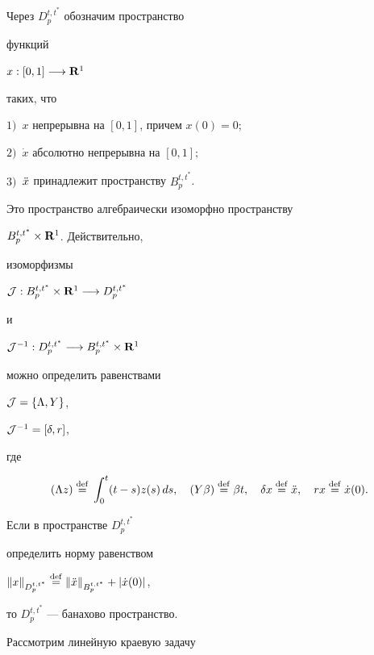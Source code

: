 Через ${ D}^{t,t^*}_p$ обозначим пространство


функций


$x:[0,1]\longrightarrow {\bold R}^1$


таких, что


{\it


$1)$~$x$ непрерывна на $[0,1]$, причем $x(0) = 0;$


$2)$~$\Dot x$ абсолютно непрерывна на $[0,1];$


$3)$~$\Ddot x$ принадлежит пространству $B^{t,t^*}_p$.


}





Это пространство алгебраически изоморфно пространству


${B}_p^{t,t^*}\times {\bold R}^1$. Действительно,


изоморфизмы


${\cal J}:{ B}^{t,t^*}_p\times{\bold R}^1 \seta


{ D}^{t,t^*}_p$


и


${\cal J}^{-1}: { D}^{t,t^*}_p


\seta { B}^{t,t^*}_p\times{\bold R}^1$


можно определить равенствами


${\cal J}=\{\Lambda, Y\}$,


${\cal J}^{-1}=[\delta, r]$,


где


$$


(\Lambda z)\eqdef\int_0^t (t-s)z(s)\,ds,\quad


(Y\beta)\eqdef\beta t,\quad


\delta x \eqdef\Ddot x,\quad


r x\eqdef \Dot x(0).


$$





Если в пространстве ${ D}^{t,t^*}_p$


определить норму равенством


$\|x\|_{D^{t,t^*}_p}\eqdef


\|\Ddot x\|_{B^{t,t^*}_p}+


|\Dot x(0)|$,


то ${ D}^{t,t^*}_p$ --- банахово пространство.





Рассмотрим линейную краевую задачу


